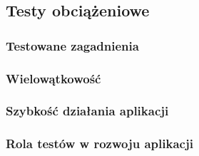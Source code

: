 \subsection{Testy obciążeniowe}

\subsubsection{Testowane zagadnienia}

\subsubsection{Wielowątkowość}

\subsubsection{Szybkość działania aplikacji}

\subsubsection{Rola testów w rozwoju aplikacji}
